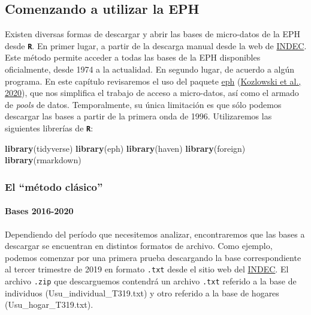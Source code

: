 \documentclass[
]{article}
\newenvironment{Shaded}{\begin{snugshade}}{\end{snugshade}}
\newcommand{\FunctionTok}[1]{\textcolor[rgb]{0.13,0.29,0.53}{\textbf{#1}}}
\newcommand{\NormalTok}[1]{#1}
\begin{document}
\hypertarget{eph2}{%
\subsection{Comenzando a utilizar la EPH}\label{eph2}}

Existen diversas formas de descargar y abrir las bases de micro-datos de la EPH desde \textbf{\texttt{R}}. En primer lugar, a partir de la descarga manual desde la web de \href{https://www.indec.gob.ar/indec/web/Institucional-Indec-BasesDeDatos}{INDEC}. Este método permite acceder a todas las bases de la EPH disponibles oficialmente, desde 1974 a la actualidad. En segundo lugar, de acuerdo a algún programa. En este capítulo revisaremos el uso del paquete \href{https://github.com/holatam/eph}{eph} (\protect\hyperlink{ref-kozlowski2020}{Kozlowski et al., 2020}), que nos simplifica el trabajo de acceso a micro-datos, así como el armado de \emph{pools} de datos. Temporalmente, su única limitación es que sólo podemos descargar las bases a partir de la primera onda de 1996. Utilizaremos las siguientes librerías de \textbf{\texttt{R}}:

\begin{Shaded}
\begin{Highlighting}[]
\FunctionTok{library}\NormalTok{(tidyverse)}
\FunctionTok{library}\NormalTok{(eph)}
\FunctionTok{library}\NormalTok{(haven)}
\FunctionTok{library}\NormalTok{(foreign)}
\FunctionTok{library}\NormalTok{(rmarkdown)}
\end{Highlighting}
\end{Shaded}

\hypertarget{el-muxe9todo-cluxe1sico}{%
\subsubsection{El ``método clásico''}\label{el-muxe9todo-cluxe1sico}}

\hypertarget{bases-2016-2020}{%
\paragraph{Bases 2016-2020}\label{bases-2016-2020}}

Dependiendo del período que necesitemos analizar, encontraremos que las bases a descargar se encuentran en distintos formatos de archivo. Como ejemplo, podemos comenzar por una primera prueba descargando la base correspondiente al tercer trimestre de 2019 en formato \texttt{.txt} desde el sitio web del \href{https://www.indec.gob.ar/ftp/cuadros/menusuperior/eph/EPH_usu_3_Trim_2019_txt.zip}{INDEC}. El archivo \texttt{.zip} que descarguemos contendrá un archivo \texttt{.txt} referido a la base de individuos (Usu\_individual\_T319.txt) y otro referido a la base de hogares (Usu\_hogar\_T319.txt).
\end{document}
